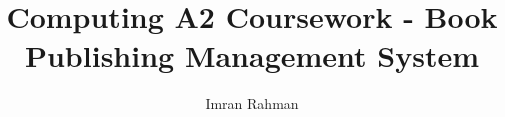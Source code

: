 \documentclass{report}
\begin{document}
\title{Computing A2 Coursework - Book Publishing Management System}
\author{Imran Rahman}
\maketitle
\tableofcontents
%
%
%
%

%
\end{document}
